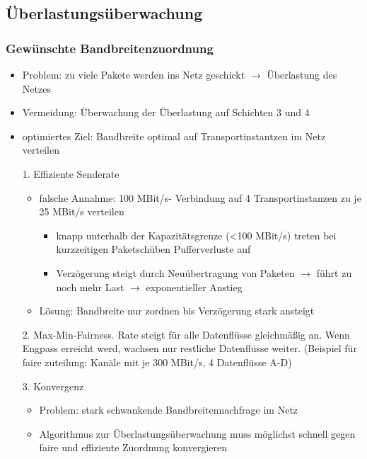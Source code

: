 \subsection{Überlastungsüberwachung}
\subsubsection{Gewünschte Bandbreitenzuordnung}
\begin{itemize}
	\item Problem: zu viele Pakete werden ins Netz geschickt $\to$ Überlastung des Netzes
	\item Vermeidung: Überwachung der Überlastung auf Schichten 3 und 4 
	\item optimiertes Ziel: Bandbreite optimal auf Transportinstantzen im Netz verteilen
	\item[1.] Effiziente Senderate
	\begin{itemize}
		\item falsche Annahme: 100 MBit/s- Verbindung auf 4 Transportinstanzen zu je 25 MBit/s verteilen
		\begin{itemize}
			\item knapp unterhalb der Kapazitätsgrenze (<100 MBit/s) treten bei kurzzeitigen Paketschüben Pufferverluste auf
			\item Verzögerung steigt durch Neuübertragung von Paketen $\to$ führt zu noch mehr Last $\to $ exponentieller Anstieg
		\end{itemize}
		\item Lösung: Bandbreite nur zordnen bis Verzögerung stark ansteigt
	\end{itemize}
	\item[2.] Max-Min-Fairness. Rate steigt für alle Datenflüsse gleichmäßig an. Wenn Engpass erreicht werd, wachsen nur restliche Datenflüsse weiter. (Beispiel für faire zuteilung: Kanäle mit je 300 MBit/s, 4 Datenflüsse A-D)
	\item[3.] Konvergenz
	\begin{itemize}
		\item Problem: stark schwankende Bandbreitennachfrage im Netz
		\item Algorithmus zur Überlastungsüberwachung muss möglichst schnell gegen faire und effiziente Zuordnung konvergieren
	\end{itemize}
\end{itemize}
